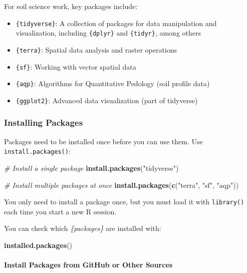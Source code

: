 \documentclass[
  10pt,
  b5paper,
  oneside]{book}
\newenvironment{Shaded}{\begin{snugshade}}{\end{snugshade}}
\newcommand{\CommentTok}[1]{\textcolor[rgb]{0.56,0.35,0.01}{\textit{#1}}}
\newcommand{\FunctionTok}[1]{\textcolor[rgb]{0.13,0.29,0.53}{\textbf{#1}}}
\newcommand{\NormalTok}[1]{#1}
\newcommand{\StringTok}[1]{\textcolor[rgb]{0.31,0.60,0.02}{#1}}
\begin{document}
For soil science work, key packages include:

\begin{itemize}
\item
  \texttt{\{tidyverse\}}: A collection of packages for data manipulation and visualization, including \texttt{\{dplyr\}} and \texttt{\{tidyr\}}, among others
\item
  \texttt{\{terra\}}: Spatial data analysis and raster operations
\item
  \texttt{\{sf\}}: Working with vector spatial data
\item
  \texttt{\{aqp\}}: Algorithms for Quantitative Pedology (soil profile data)
\item
  \texttt{\{ggplot2\}}: Advanced data visualization (part of tidyverse)
\end{itemize}

\subsubsection{Installing Packages}\label{installing-packages}

Packages need to be installed once before you can use them.
Use \texttt{install.packages()}:

\begin{Shaded}
\begin{Highlighting}[]
\CommentTok{\# Install a single package}
\FunctionTok{install.packages}\NormalTok{(}\StringTok{"tidyverse"}\NormalTok{)}

\CommentTok{\# Install multiple packages at once}
\FunctionTok{install.packages}\NormalTok{(}\FunctionTok{c}\NormalTok{(}\StringTok{"terra"}\NormalTok{, }\StringTok{"sf"}\NormalTok{, }\StringTok{"aqp"}\NormalTok{))}
\end{Highlighting}
\end{Shaded}

You only need to install a package once, but you must load it with \texttt{library()} each time you start a new R session.

You can check which \emph{\{packages\}} are installed with:

\begin{Shaded}
\begin{Highlighting}[]
\FunctionTok{installed.packages}\NormalTok{()}
\end{Highlighting}
\end{Shaded}

\paragraph*{Install Packages from GitHub or Other Sources}\label{install-packages-from-github-or-other-sources}
\end{document}
